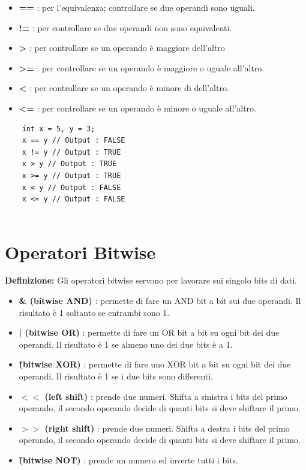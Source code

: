 \begin{itemize}
	\item \textsf{\small \textbf{==} : per l'equivalenza; controllare se due operandi sono uguali.}
	\item \textsf{\small \textbf{!=} : per controllare se due operandi non sono equivalenti.}
	\item \textsf{\small \textbf{>} : per controllare se un operando è maggiore dell'altro}
	\item \textsf{\small \textbf{>=} : per controllare se un operando è maggiore o uguale all'altro.}
	\item \textsf{\small \textbf{<} : per controllare se un operando è minore di dell'altro.}
	\item \textsf{\small \textbf{<=} : per controllare se un operando è minore o uguale all'altro.}
\end{itemize}

\begin{lstlisting}
	int x = 5, y = 3;
	x == y // Output : FALSE
	x != y // Output : TRUE
	x > y // Output : TRUE
	x >= y // Output : TRUE
	x < y // Output : FALSE
	x <= y // Output : FALSE
	
\end{lstlisting}


\section{Operatori Bitwise}

\textsf{\small \textbf{Definizione: } Gli operatori bitwise servono per lavorare sui singolo bits di dati.} \\

\begin{itemize}
	\item \textsf{\small \textbf{\& (bitwise AND)} : permette di fare un AND bit a bit sui due operandi. Il risultato è 1 soltanto se entrambi sono 1.}
	\item \textsf{\small \textbf{| (bitwise OR)} : permette di fare un OR bit a bit su ogni bit dei due operandi. Il risultato è 1 se almeno uno dei due bits è a 1.}
	\item \textsf{\small \textbf{\^  (bitwise XOR)} : permette di fare uno XOR bit a bit su ogni bit dei due operandi. Il risultato è 1 se i due bits sono differenti.}
	\item \textsf{\small \textbf{$<<$ (left shift)} : prende due numeri. Shifta a sinistra i bits del primo operando, il secondo operando decide di quanti bits si deve shiftare il primo.}
	\item \textsf{\small \textbf{$>>$ (right shift)} : prende due numeri. Shifta a destra i bits del primo operando, il secondo operando decide di quanti bits si deve shiftare il primo.}
	\item \textsf{\small \textbf{\~ (bitwise NOT)} : prende un numero ed inverte tutti i bits.}
\end{itemize}

